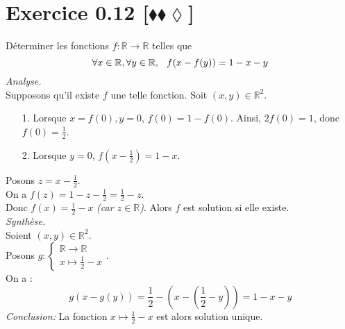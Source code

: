 \documentclass[10pt]{article}
\begin{document}
\section*{Exercice 0.12 [$\blacklozenge\blacklozenge\lozenge$]}
\begin{tcolorbox}[enhanced, width=7in, center, size=fbox, fontupper=\large, drop shadow southwest]
    Déterminer les fonctions $f: \mathbb{R} \rightarrow \mathbb{R}$ telles que 
    \begin{equation*}
        \forall{x\in\mathbb{R}},\forall{y\in\mathbb{R}}, \hspace{0.25cm} f(x-f(y)) = 1-x-y
    \end{equation*}
    \emph{Analyse.}\\
    Supposons qu'il existe $f$ une telle fonction. Soit $(x,y)\in\mathbb{R}^2$.
    \begin{itemize}
        \item[1.] Lorsque $x=f(0), y=0$, $f(0)=1-f(0)$. Ainsi, $2f(0)=1$, donc $f(0)=\frac{1}{2}$.
        \item[2.] Lorsque $y=0$, $f(x-\frac{1}{2})=1-x$.
    \end{itemize}
    Posons $z=x-\frac{1}{2}$.\\
    On a $f(z)=1-z-\frac{1}{2} = \frac{1}{2}-z$.\\
    Donc $f(x)=\frac{1}{2}-x$ \emph{(car $z\in\mathbb{R}$)}.
    Alors $f$ est solution si elle existe.\\[0.25cm]
    \emph{Synthèse.}\\
    Soient $(x,y)\in\mathbb{R}^2$.\\
    Posons $g:\begin{cases}\mathbb{R}\rightarrow\mathbb{R}\\x\mapsto{\frac{1}{2}-x}\end{cases}$.\\
    On a :
    \begin{equation*}
        g(x-g(y))=\frac{1}{2}-(x - (\frac{1}{2}-y)) = 1 - x - y
    \end{equation*}
    \emph{Conclusion:} 
    La fonction $x\mapsto\frac{1}{2}-x$ est alors solution unique.
\end{tcolorbox}
\end{document}

